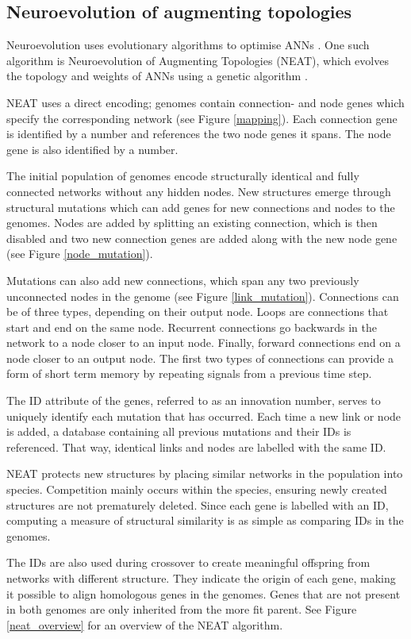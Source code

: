 \subsection{Neuroevolution of augmenting topologies}
Neuroevolution uses evolutionary algorithms to optimise ANNs \cite{neuroevolution_review}.
One such algorithm is Neuroevolution of Augmenting Topologies (NEAT), which evolves the topology and weights of ANNs
using a genetic algorithm \cite{neat_main, neat_short, neat_phd}.

NEAT uses a direct encoding; genomes contain connection- and node genes which specify the corresponding
network (see Figure \ref{mapping}). Each connection gene is identified by a number and
references the two node genes it spans. The node gene is also identified by a number.



The initial population of genomes encode structurally identical and fully connected networks without any hidden nodes.
New structures emerge through structural mutations which can add genes for new connections and nodes to the genomes.
Nodes are added by splitting an existing connection, which is then disabled and two new connection genes are added along
with the new node gene (see Figure \ref{node_mutation}).



Mutations can also add new connections, which span any two previously unconnected nodes in the genome (see Figure \ref{link_mutation}).
Connections can be of three types, depending on their output node. Loops are connections that start and end on the same node. Recurrent
connections go backwards in the network to a node closer to an input node. Finally, forward connections end on a node closer to an output
node. The first two types of connections can provide a form of short term memory by repeating signals from a previous time step.



The ID attribute of the genes, referred to as an innovation number, serves to uniquely identify each mutation that has occurred.
Each time a new link or node is added, a database containing all previous mutations and their IDs is referenced. That way,
identical links and nodes are labelled with the same ID.

NEAT protects new structures by placing similar networks in the population into species.
Competition mainly occurs within the species, ensuring newly created structures are not prematurely deleted.
Since each gene is labelled with an ID, computing a measure of structural similarity is as simple as
comparing IDs in the genomes.

The IDs are also used during crossover to create meaningful offspring from networks with different structure.
They indicate the origin of each gene, making it possible to align homologous genes in the genomes. Genes
that are not present in both genomes are only inherited from the more fit parent. See Figure \ref{neat_overview} for an overview
of the NEAT algorithm.


